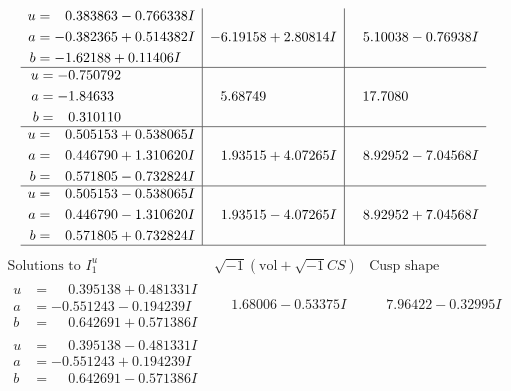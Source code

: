 \documentclass[1p]{elsarticle_modified}
\theoremstyle{definition}
\newcommand{\I}{\sqrt{-1}}
\begin{document}
$$\begin{array}{c|c|c}
\begin{aligned}
u &= \phantom{-}0.383863 - 0.766338 I \\
a &= -0.382365 + 0.514382 I \\
b &= -1.62188 + 0.11406 I\end{aligned}
 & -6.19158 + 2.80814 I & \phantom{-}5.10038 - 0.76938 I \\ \hline\begin{aligned}
u &= -0.750792\phantom{ +0.000000I} \\
a &= -1.84633\phantom{ +0.000000I} \\
b &= \phantom{-}0.310110\phantom{ +0.000000I}\end{aligned}
 & \phantom{-}5.68749\phantom{ +0.000000I} & \phantom{-}17.7080\phantom{ +0.000000I} \\ \hline\begin{aligned}
u &= \phantom{-}0.505153 + 0.538065 I \\
a &= \phantom{-}0.446790 + 1.310620 I \\
b &= \phantom{-}0.571805 - 0.732824 I\end{aligned}
 & \phantom{-}1.93515 + 4.07265 I & \phantom{-}8.92952 - 7.04568 I \\ \hline\begin{aligned}
u &= \phantom{-}0.505153 - 0.538065 I \\
a &= \phantom{-}0.446790 - 1.310620 I \\
b &= \phantom{-}0.571805 + 0.732824 I\end{aligned}
 & \phantom{-}1.93515 - 4.07265 I & \phantom{-}8.92952 + 7.04568 I\\
 \hline 
 \end{array}$$\newpage$$\begin{array}{c|c|c}  
\text{Solutions to }I^u_{1}& \I (\text{vol} + \sqrt{-1}CS) & \text{Cusp shape}\\
 \hline 
\begin{aligned}
u &= \phantom{-}0.395138 + 0.481331 I \\
a &= -0.551243 - 0.194239 I \\
b &= \phantom{-}0.642691 + 0.571386 I\end{aligned}
 & \phantom{-}1.68006 - 0.53375 I & \phantom{-}7.96422 - 0.32995 I \\ \hline\begin{aligned}
u &= \phantom{-}0.395138 - 0.481331 I \\
a &= -0.551243 + 0.194239 I \\
b &= \phantom{-}0.642691 - 0.571386 I\end{aligned}

\end{array}$$
\end{document}
